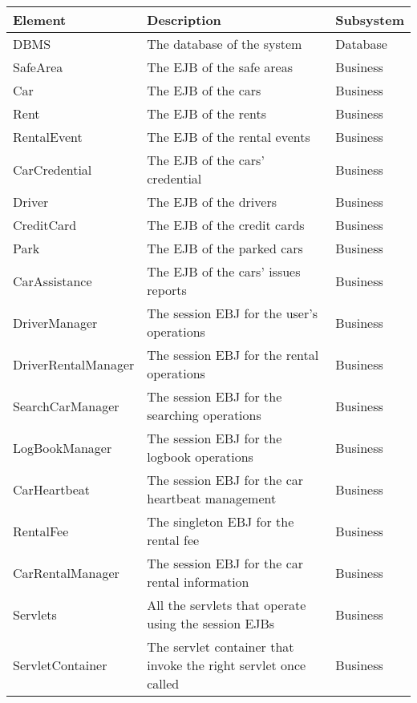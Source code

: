 \begin{table} [H]
    \centering
    \begin{small}
    \begin{tabular}{| p{} | p{} | p{} |}
    \hline
    \textbf{Element} & \textbf{Description} & \textbf{Subsystem} \\
    \hline
    DBMS & The database of the system & Database\\
    \hline
    SafeArea & The EJB of the safe areas & Business\\
    \hline
    Car & The EJB of the cars & Business\\
    \hline
    Rent & The EJB of the rents & Business\\
    \hline
    RentalEvent & The EJB of the rental events & Business\\
    \hline
    CarCredential & The EJB of the cars' credential & Business\\
    \hline
    Driver & The EJB of the drivers & Business\\
    \hline
    CreditCard & The EJB of the credit cards & Business\\
    \hline
    Park & The EJB of the parked cars & Business\\
   \hline
    CarAssistance & The EJB of the cars' issues reports & Business\\
    \hline
    DriverManager & The session EBJ for the user's operations & Business\\
    \hline
    DriverRentalManager & The session EBJ for the rental operations & Business\\
    \hline
    SearchCarManager & The session EBJ for the searching operations & Business\\
    \hline
    LogBookManager & The session EBJ for the logbook operations & Business\\
    \hline
    CarHeartbeat & The session EBJ for the car heartbeat management & Business\\
    \hline
    RentalFee & The singleton EBJ for the rental fee  & Business\\
    \hline
    CarRentalManager & The session EBJ for the car rental information & Business\\
    \hline
    Servlets & All the servlets that operate using the session EJBs & Business\\
    \hline
    ServletContainer & The servlet container that invoke the right servlet once called & Business\\

\end{tabular}
\end{small}
\end{table}
